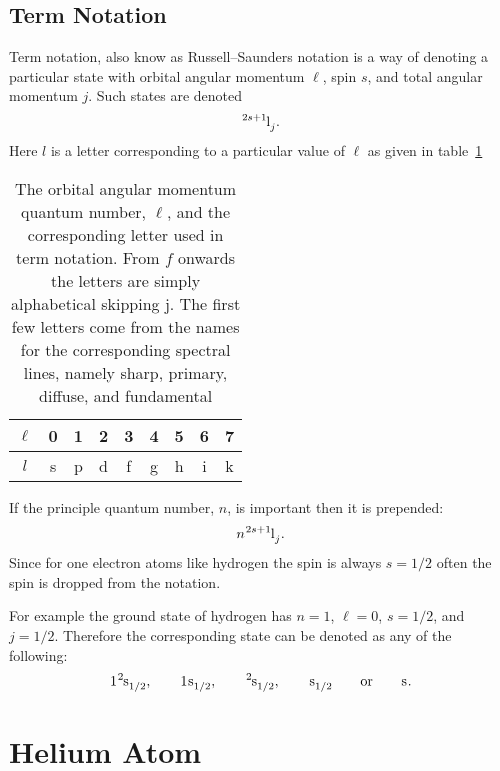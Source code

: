     \subsection{Term Notation}
    Term notation, also know as Russell--Saunders notation is a way of denoting a particular state with orbital angular momentum \(\ell\), spin \(s\), and total angular momentum \(j\).
    Such states are denoted
    \[\termNotation{2s + 1}{l}{j}.\]
    Here \(l\) is a letter corresponding to a particular value of \(\ell\) as given in table~\ref{tab:l letters}
    \begin{table}[ht]
        \centering
        \begin{tabular}{c|cccccccc}
            \(\ell\) & 0 & 1 & 2 & 3 & 4 & 5 & 6 & 7\\\hline
            \(l\)    & s & p & d & f & g & h & i & k
        \end{tabular}
        \caption{The orbital angular momentum quantum number, \(\ell\), and the corresponding letter used in term notation. From \(f\) onwards the letters are simply alphabetical skipping \(\mathrm{j}\). The first few letters come from the names for the corresponding spectral lines, namely sharp, primary, diffuse, and fundamental}
        \label{tab:l letters}
    \end{table}
    If the principle quantum number, \(n\), is important then it is prepended:
    \[\termNotation[n]{2s + 1}{l}{j}.\]
    Since for one electron atoms like hydrogen the spin is always \(s = 1/2\) often the spin is dropped from the notation.
    
    For example the ground state of hydrogen has \(n = 1\), \(\ell = 0\), \(s = 1/2\), and \(j = 1/2\).
    Therefore the corresponding state can be denoted as any of the following:
    \[\termNotation[1]{2}{\mathrm{s}}{1/2}, \qquad \termNotation[1]{}{\mathrm{s}}{1/2}, \qquad \termNotation{2}{\mathrm{s}}{1/2}, \qquad \termNotation{}{\mathrm{s}}{1/2} \qquad\text{or}\qquad \termNotation{}{\mathrm{s}}{}.\]
    
    \section{Helium Atom}
